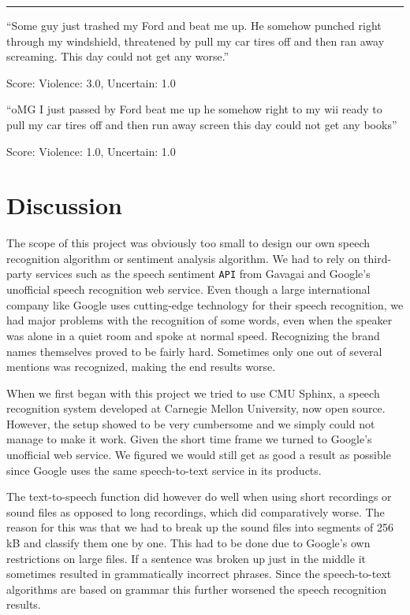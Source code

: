 \documentclass[a4paper,12pt,twoside]{ltxdoc}
\newcommand*\sepline{%
  \begin{center}
    \rule[1ex]{.5\textwidth}{.5pt}
  \end{center}}
\begin{document}
\sepline 

\begin{center}
``Some guy just trashed my Ford and beat me up. He somehow punched right through my windshield, threatened by pull my car tires off and then ran away screaming. This day could not get any worse.''
\end{center}
\hfill Score: Violence: 3.0, Uncertain: 1.0

\begin{center}
``oMG I just passed by Ford beat me up he somehow right to my wii ready to pull my car tires off and then run away screen this day could not get any books''
\end{center}
\hfill Score: Violence: 1.0, Uncertain: 1.0

\section{Discussion}
The scope of this project was obviously too small to design our own speech recognition algorithm or sentiment analysis algorithm. We had to rely on third-party services such as the speech sentiment \verb#API# from Gavagai and Google's unofficial speech recognition web service. Even though a large international company like Google uses cutting-edge technology for their speech recognition, we had major problems with the recognition of some words, even when the speaker was alone in a quiet room and spoke at normal speed. Recognizing the brand names themselves proved to be fairly hard. Sometimes only one out of several mentions was recognized, making the end results worse. 

When we first began with this project we tried to use CMU Sphinx, a speech recognition system developed at Carnegie Mellon University, now open source. However, the setup showed to be very cumbersome and we simply could not manage to make it work. Given the short time frame we turned to Google's unofficial web service. We figured we would still get as good a result as possible since Google uses the same speech-to-text service in its products. 

The text-to-speech function did however do well when using short recordings or sound files as opposed to long recordings, which did comparatively worse. The reason for this was that we had to break up the sound files into segments of 256 kB and classify them one by one. This had to be done due to Google's own restrictions on large files. If a sentence was broken up just in the middle it sometimes resulted in grammatically incorrect phrases. Since the speech-to-text algorithms are based on grammar this further worsened the speech recognition results.
\end{document}

